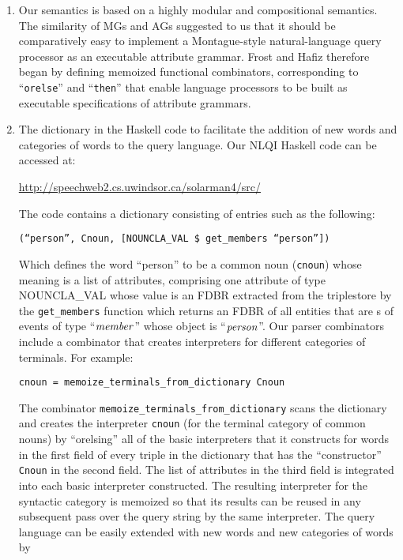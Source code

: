 \documentclass[../main.tex]{subfiles}
\begin{document}
\begin{refsection}
\begin{enumerate}
	\item Our semantics is based on a highly modular and compositional semantics. The similarity of MGs and AGs suggested to us that it should
	be comparatively easy to implement a Montague-style natural-language query processor as an
	executable attribute grammar.  Frost and Hafiz \cite{frosthafiz2008} therefore began by defining memoized functional combinators, corresponding to ``\texttt{orelse}'' and ``\texttt{then}'' that enable language processors to be built as executable specifications of attribute grammars.

	\item The dictionary in the Haskell code to facilitate the addition of new words and
	categories of words to the query language. Our NLQI Haskell code can be accessed at:
	\begin{center} \url{http://speechweb2.cs.uwindsor.ca/solarman4/src/} \end{center}
	The code contains a dictionary consisting of entries such as the following:
	\begin{center} \texttt{(``person'', Cnoun, [NOUNCLA\_VAL \$ get\_members ``person''])} \end{center}
	Which defines the word ``person'' to be a common noun (\texttt{cnoun}) whose meaning is a
	list of attributes, comprising one attribute of type NOUNCLA\_VAL whose value is an FDBR extracted from the triplestore by the \texttt{get\_members} function which returns an FDBR of all entities
	that are s of events of type ``$\operatorname{\mathit{member}}$'' whose object is ``$\operatorname{\mathit{person}}$''. Our parser
	combinators include a combinator that creates interpreters for different categories of terminals.
	For example:
	\begin{center} \texttt{cnoun = memoize\_terminals\_from\_dictionary Cnoun} \end{center}
	The combinator \texttt{memoize\_terminals\_from\_dictionary} scans the dictionary and
	creates the interpreter \texttt{cnoun} (for the terminal category of common nouns) by ``orelsing''
	all of the basic interpreters that it constructs for words in the first field of every triple in the
	dictionary that has the ``constructor'' \texttt{Cnoun} in the second field. The list of attributes in the
	third field is integrated into each basic interpreter constructed. The resulting interpreter for the
	syntactic category is memoized so that its results can be reused in any subsequent pass over the
	query string by the same interpreter.
	The query language can be easily extended with new words and new categories of words by

\end{enumerate}
\end{refsection}
\end{document}
